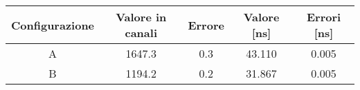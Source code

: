 \begin{center}
\begin{tabulary}{\textwidth}{CCCCC}
\toprule
Configurazione	& Valore in canali	& Errore	& Valore [ns]		& Errori [ns]	\\ \midrule
A		& 1647.3		& 0.3		& 43.110		& 0.005		\\ \midrule
B		& 1194.2		& 0.2		& 31.867		& 0.005		\\
\bottomrule
\end{tabulary}
\end{center} 
